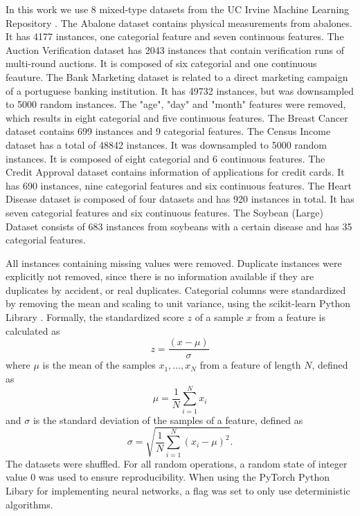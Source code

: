 In this work we use 8 mixed-type datasets from the UC Irvine Machine Learning Repository \cite{uci_ml_rpo}.
The Abalone dataset \cite{abalone} contains physical measurements from abalones. It has 4177 instances, one categorial feature and seven continuous features.
The Auction Verification dataset \cite{auction_verification} has 2043 instances that contain verification runs of multi-round auctions. It is composed of six categorial and one continuous feauture.
The Bank Marketing dataset \cite{bank_marketing} is related to a direct marketing campaign of a portuguese banking institution. It has 49732 instances, but was downsampled to 5000 random instances. The "age", "day" and "month" features were removed, which results in eight categorial and five continuous features.
The Breast Cancer dataset \cite{breast_cancer} contains 699 instances and 9 categorial features.
The Census Income dataset \cite{census_income} has a total of 48842 instances. It was downsampled to 5000 random instances. It is composed of eight categorial and 6 continuous features.
The Credit Approval dataset \cite{credit_approval} contains information of applications for credit cards. It has 690 instances, nine categorial features and six continuous features.
The Heart Disease dataset \cite{heart_disease} is composed of four datasets and has 920 instances in total. It has seven categorial features and six continuous features.
The Soybean (Large) Dataset \cite{abalone} consists of 683 instances from soybeans with a certain disease and has 35 categorial features.

All instances containing missing values were removed. Duplicate instances were explicitly not removed, since there is no information available if they are duplicates by accident, or real duplicates. Categorial columns were standardized by removing the mean and scaling to unit variance, using the scikit-learn Python Library \cite{scikit_learn}. Formally, the standardized score $z$ of a sample $x$ from a feature is calculated as
$$z = \frac{(x-\mu)}{\sigma}$$
where $\mu$ is the mean of the samples $x_1, ...,x_N$ from a feature of length $N$, defined as
$$\mu = \frac{1}{N} \sum^{N}_{i=1} x_i$$
and $\sigma$ is the standard deviation of the samples of a feature, defined as
$$\sigma = \sqrt{\frac{1}{N} \sum^{N}_{i=1}(x_i - \mu)^2}.$$
The datasets were shuffled. For all random operations, a random state of integer value 0 was used to ensure reproducibility. When using the PyTorch Python Libary \cite{pytorch} for implementing neural networks, a flag was set to only use deterministic algorithms.

